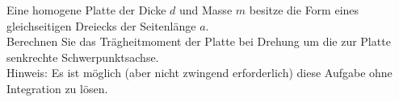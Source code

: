 \begin{Exercise}[label = Trägheitsmoment, origin = {4. Runde zur 44. IPhO 2013}, title = Trägheitsmoment, difficulty = 2]
Eine homogene Platte der Dicke $d$ und Masse $m$ besitze die Form eines gleichseitigen Dreiecks der
Seitenlänge $a$.\\
Berechnen Sie das Trägheitmoment der Platte bei Drehung um die zur Platte senkrechte Schwerpunktsachse.\\
Hinweis: Es ist möglich (aber nicht zwingend erforderlich) diese Aufgabe ohne Integration zu lösen.
\end{Exercise}
